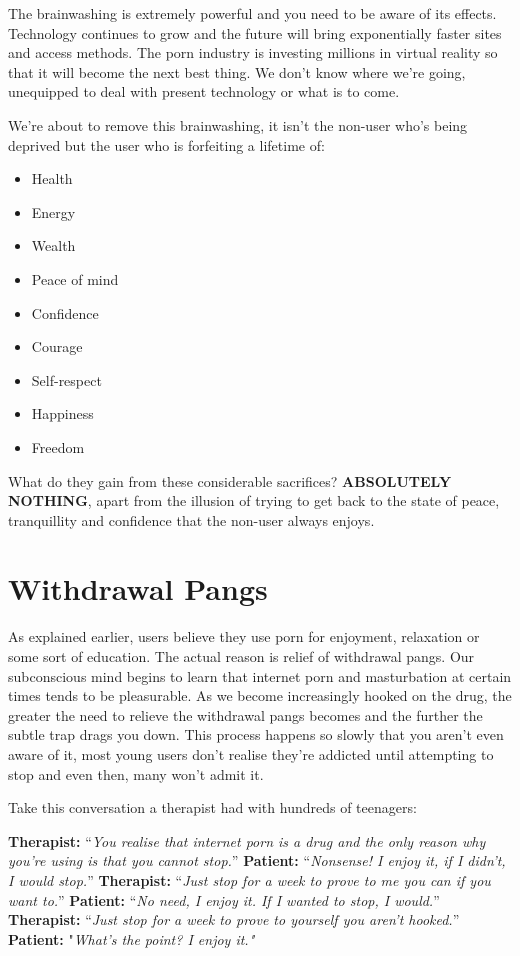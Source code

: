 \documentclass[
]{book}
\begin{document}
The brainwashing is extremely powerful and you need to be aware of its effects. Technology continues to grow and the future will bring exponentially faster sites and access methods. The porn industry is investing millions in virtual reality so that it will become the next best thing. We don't know where we're going, unequipped to deal with present technology or what is to come.

We're about to remove this brainwashing, it isn't the non-user who's being deprived but the user who is forfeiting a lifetime of:

\begin{itemize}
\item
  Health
\item
  Energy
\item
  Wealth
\item
  Peace of mind
\item
  Confidence
\item
  Courage
\item
  Self-respect
\item
  Happiness
\item
  Freedom
\end{itemize}

What do they gain from these considerable sacrifices? \textbf{ABSOLUTELY NOTHING}, apart from the illusion of trying to get back to the state of peace, tranquillity and confidence that the non-user always enjoys.

\hypertarget{withdrawal-pangs}{%
\section{Withdrawal Pangs}\label{withdrawal-pangs}}

As explained earlier, users believe they use porn for enjoyment, relaxation or some sort of education. The actual reason is relief of withdrawal pangs. Our subconscious mind begins to learn that internet porn and masturbation at certain times tends to be pleasurable. As we become increasingly hooked on the drug, the greater the need to relieve the withdrawal pangs becomes and the further the subtle trap drags you down. This process happens so slowly that you aren't even aware of it, most young users don't realise they're addicted until attempting to stop and even then, many won't admit it.

Take this conversation a therapist had with hundreds of teenagers:

\textbf{Therapist:} ``\emph{You realise that internet porn is a drug and the only reason why you're using is that you cannot stop.}''
\textbf{Patient:} ``\emph{Nonsense! I enjoy it, if I didn't, I would stop.}''
\textbf{Therapist:} ``\emph{Just stop for a week to prove to me you can if you want to.}''
\textbf{Patient:} ``\emph{No need, I enjoy it. If I wanted to stop, I would.}''
\textbf{Therapist:} ``\emph{Just stop for a week to prove to yourself you aren't hooked.}''
\textbf{Patient:} "\emph{What's the point? I enjoy it."}
\end{document}
